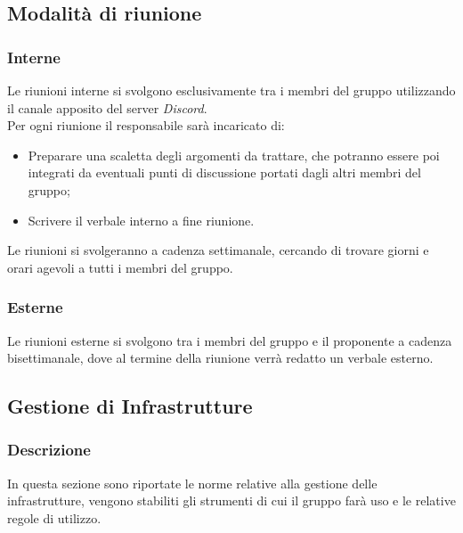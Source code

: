     \subsection{Modalità di riunione}
        \subsubsection{Interne}
        Le riunioni interne si svolgono esclusivamente tra i membri del gruppo utilizzando il canale apposito
        del server \textit{Discord}.\\
        Per ogni riunione il responsabile sarà incaricato di:
        \begin{itemize}
            \item Preparare una scaletta degli argomenti da trattare, che potranno essere poi integrati da eventuali
            punti di discussione portati dagli altri membri del gruppo;
            \item Scrivere il verbale interno a fine riunione.
        \end{itemize}

        Le riunioni si svolgeranno a cadenza settimanale, cercando di trovare giorni e orari agevoli a tutti i
        membri del gruppo.

        \subsubsection{Esterne}
        Le riunioni esterne si svolgono tra i membri del gruppo e il proponente a cadenza bisettimanale,
        dove al termine della riunione verrà redatto un verbale esterno.



    \subsection{Gestione di Infrastrutture}
        \subsubsection{Descrizione}
        In questa sezione sono riportate le norme relative alla gestione delle infrastrutture, vengono stabiliti gli
        strumenti di cui il gruppo farà uso e le relative regole di utilizzo.

